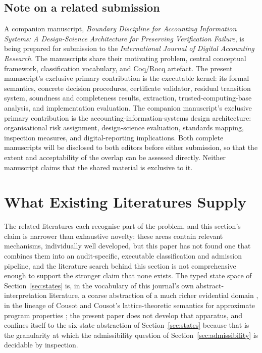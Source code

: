 \documentclass[smallcondensed,envcountsect,natbib]{svjour3}
\begin{document}
\subsection*{Note on a related submission}
A companion manuscript, \emph{Boundary Discipline for Accounting Information Systems: A Design-Science Architecture for Preserving Verification Failure}, is being prepared for submission to the \emph{International Journal of Digital Accounting Research}. The manuscripts share their motivating problem, central conceptual framework, classification vocabulary, and Coq/Rocq artefact. The present manuscript's exclusive primary contribution is the executable kernel: its formal semantics, concrete decision procedures, certificate validator, residual transition system, soundness and completeness results, extraction, trusted-computing-base analysis, and implementation evaluation. The companion manuscript's exclusive primary contribution is the accounting-information-systems design architecture: organisational risk assignment, design-science evaluation, standards mapping, inspection measures, and digital-reporting implications. Both complete manuscripts will be disclosed to both editors before either submission, so that the extent and acceptability of the overlap can be assessed directly. Neither manuscript claims that the shared material is exclusive to it.

\section{What Existing Literatures Supply}
\label{sec:related}

The related literatures each recognise part of the problem, and this section's claim is narrower than exhaustive novelty: these areas contain relevant mechanisms, individually well developed, but this paper has not found one that combines them into an audit-specific, executable classification and admission pipeline, and the literature search behind this section is not comprehensive enough to support the stronger claim that none exists. The typed state space of Section~\ref{sec:states} is, in the vocabulary of this journal's own abstract-interpretation literature, a coarse abstraction of a much richer evidential domain \citep{rustenholz2026}, in the lineage of Cousot and Cousot's lattice-theoretic semantics for approximate program properties \citep{cousot1977}; the present paper does not develop that apparatus, and confines itself to the six-state abstraction of Section~\ref{sec:states} because that is the granularity at which the admissibility question of Section~\ref{sec:admissibility} is decidable by inspection.
\end{document}

